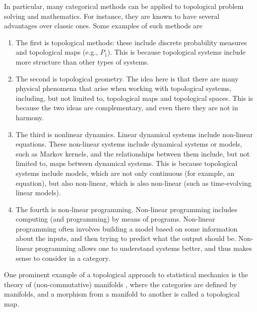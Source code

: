 \documentclass[a4paper,reqno,oneside]{article}
\begin{document}
In particular, many categorical methods can be applied to topological problem solving and mathematics. For instance, they are known to have several advantages over classic ones. Some examples of such methods are
\begin{enumerate}[label=(\roman*)]
    \item The first is topological methods: these include discrete probability measures and topological maps (e.g., $P_1$). This is because topological systems include more structure than other types of systems. 
    \item The second is topological geometry. The idea here is that there are many physical phenomena that arise when working with topological systems, including, but not limited to, topological maps and topological spaces. This is because the two ideas are complementary, and even there they are not in harmony.
    \item The third is nonlinear dynamics. Linear dynamical systems include non-linear equations. These non-linear systems include dynamical systems or models, such as Markov kernels, and the relationships between them include, but not limited to, maps between dynamical systems. This is because topological systems include models, which are not only continuous (for example, an equation), but also non-linear, which is also non-linear (such as time-evolving linear models). 
    \item The fourth is non-linear programming. Non-linear programming includes computing (and programming) by means of programs. Non-linear programming often involves building a model based on some information about the inputs, and then trying to predict what the output should be. Non-linear programming allows one to understand systems better, and thus makes sense to consider in a category. 
\end{enumerate}

One prominent example of a topological approach to statistical mechanics is the theory of (non-commutative) manifolds \cite{AbelianManifoldTheory}, where the categories are defined by manifolds, and a morphism from a manifold to another is called a topological map. 
\end{document}
